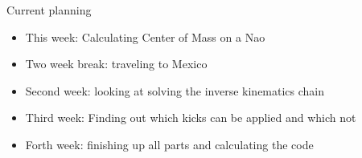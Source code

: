 \documentclass{beamer}
\begin{document}
\begin{frame}{Current planning}
    \begin{itemize}
    \item{This week: Calculating Center of Mass on a Nao}
    \item{Two week break: traveling to Mexico}
    \item{Second week: looking at solving the inverse kinematics chain}
    \item{Third week: Finding out which kicks can be applied and which not }
    \item{Forth week: finishing up all parts and calculating the code} 
    \end{itemize}
\end{frame}
\end{document}
